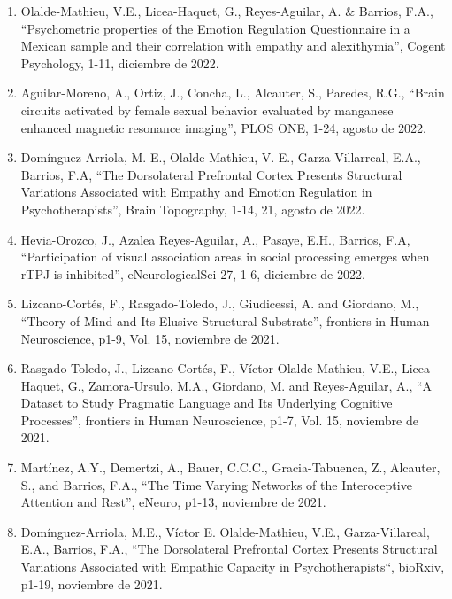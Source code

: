 \begin{enumerate}
\item Olalde-Mathieu, V.E., Licea-Haquet, G., Reyes-Aguilar, A. \& Barrios, F.A., “Psychometric properties of the Emotion 
Regulation Questionnaire in a Mexican sample and their correlation with empathy and alexithymia”, Cogent Psychology, 1-11, diciembre de 2022.

\item Aguilar-Moreno, A., Ortiz, J., Concha, L., Alcauter, S., Paredes, R.G., “Brain circuits activated by female sexual 
behavior evaluated by manganese enhanced magnetic resonance imaging”, PLOS ONE, 1-24, agosto de 2022.

\item Domínguez-Arriola, M. E., Olalde-Mathieu, V. E., Garza-Villarreal, E.A., Barrios, F.A, “The Dorsolateral Prefrontal 
Cortex Presents Structural Variations Associated with Empathy and Emotion Regulation in Psychotherapists”, Brain 
Topography, 1-14, 21, agosto de 2022.

\item Hevia-Orozco, J., Azalea Reyes-Aguilar, A., Pasaye, E.H., Barrios, F.A, “Participation of visual association areas in 
social processing emerges when rTPJ is inhibited”, eNeurologicalSci 27, 1-6, diciembre de 2022.

\item Lizcano-Cortés, F., Rasgado-Toledo, J., Giudicessi, A. and Giordano, M., “Theory of Mind and Its Elusive Structural 
Substrate”, frontiers in Human Neuroscience, p1-9, Vol. 15, noviembre de 2021.

\item Rasgado-Toledo, J., Lizcano-Cortés, F., Víctor Olalde-Mathieu, V.E., Licea-Haquet, G., Zamora-Ursulo, M.A., Giordano, 
M. and Reyes-Aguilar, A., “A Dataset to Study Pragmatic Language and Its Underlying Cognitive Processes”, frontiers in 
Human Neuroscience, p1-7, Vol. 15, noviembre de 2021.

\item Martínez, A.Y., Demertzi, A., Bauer, C.C.C., Gracia-Tabuenca, Z., Alcauter, S., and Barrios, F.A., “The Time Varying 
Networks of the Interoceptive Attention and Rest”, eNeuro, p1-13, noviembre de 2021.

\item Domínguez-Arriola, M.E., Víctor E. Olalde-Mathieu, V.E., Garza-Villareal, E.A., Barrios, F.A., “The Dorsolateral 
Prefrontal Cortex Presents Structural Variations Associated with Empathic Capacity in Psychotherapists“, bioRxiv, p1-19,  noviembre de 2021.


\end{enumerate}
